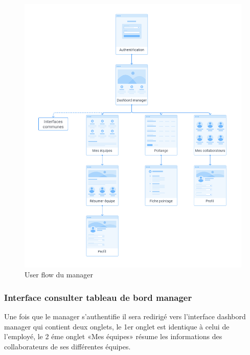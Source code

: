 \begin{figure}[h!]
    \vspace{-10pt}
    \centering
    \includegraphics[scale=0.38 ]{images/interface/Espace manager.png}
    \vspace{-30pt}
    \caption{User flow du manager}
    \label{fig95}
\end{figure}
            
\clearpage

\subsubsection*{Interface consulter tableau de bord manager}
Une fois que le manager s'authentifie il sera redirigé vers l’interface dashbord 
manager qui contient deux onglets, le 1er onglet est identique à celui de 
l’employé, le 2 éme onglet «Mes équipes» résume les informations des 
collaborateurs de ses différentes équipes. 
            
